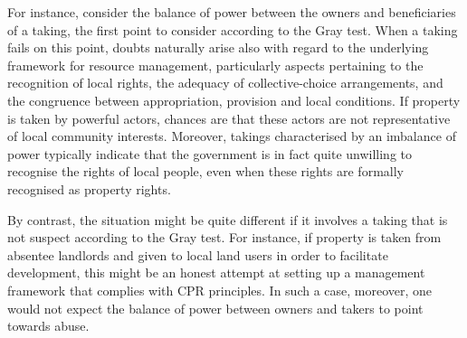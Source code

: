 
For instance, consider the balance of power between the owners and beneficiaries of a taking, the first point to consider according to the Gray test. When a taking fails on this point, doubts naturally arise also with regard to the underlying framework for resource management, particularly aspects pertaining to the recognition of local rights, the adequacy of collective-choice arrangements, and the congruence between appropriation, provision and local conditions. If property is taken by powerful actors, chances are that these actors are not representative of local community interests. Moreover, takings characterised by an imbalance of power typically indicate that the government is in fact quite unwilling to recognise the rights of local people, even when these rights are formally recognised as property rights.

By contrast, the situation might be quite different if it involves a taking that is not suspect according to the Gray test. For instance, if property is taken from absentee landlords and given to local land users in order to facilitate development, this might be an honest attempt at setting up a management framework that complies with CPR principles. In such a case, moreover, one would not expect the balance of power between owners and takers to point towards abuse.

